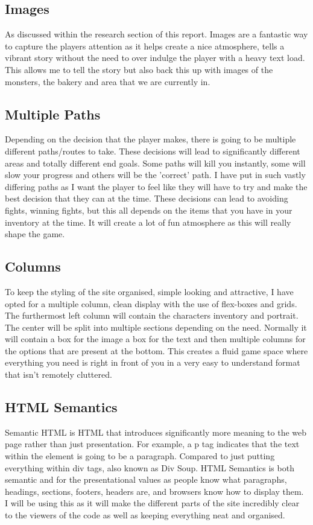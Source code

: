\documentclass[10pt, a4paper]{article}
\begin{document}
    \subsection{Images}
    As discussed within the research section of this report. Images are a fantastic way to capture the players attention as it helps create a nice atmosphere, tells a vibrant story without the need to over indulge the player with a heavy text load. This allows me to tell the story but also back this up with images of the monsters, the bakery and area that we are currently in. 
    
    \subsection{Multiple Paths}
    Depending on the decision that the player makes, there is going to be multiple different paths/routes to take. These decisions will lead to significantly different areas and totally different end goals. Some paths will kill you instantly, some will slow your progress and others will be the 'correct' path. I have put in such vastly differing paths as I want the player to feel like they will have to try and make the best decision that they can at the time. These decisions can lead to avoiding fights, winning fights, but this all depends on the items that you have in your inventory at the time. It will create a lot of fun atmosphere as this will really shape the game.
    
    \subsection{Columns}
    To keep the styling of the site organised, simple looking and attractive, I have opted for a multiple column, clean display with the use of flex-boxes and grids. The furthermost left column will contain the characters inventory and portrait. The center will be split into multiple sections depending on the need. Normally it will contain a box for the image a box for the text and then multiple columns for the options that are present at the bottom. This creates a fluid game space where everything you need is right in front of you in a very easy to understand format that isn't remotely cluttered. 

    \subsection{HTML Semantics}
    Semantic HTML is HTML that introduces significantly more meaning to the web page rather than just presentation. For example, a p tag indicates that the text within the element is going to be a paragraph. Compared to just putting everything within div tags, also known as Div Soup. HTML Semantics is both semantic and for the presentational values as people know what paragraphs, headings, sections, footers, headers are, and browsers know how to display them. I will be using this as it will make the different parts of the site incredibly clear to the viewers of the code as well as keeping everything neat and organised. 
    
\end{document}
